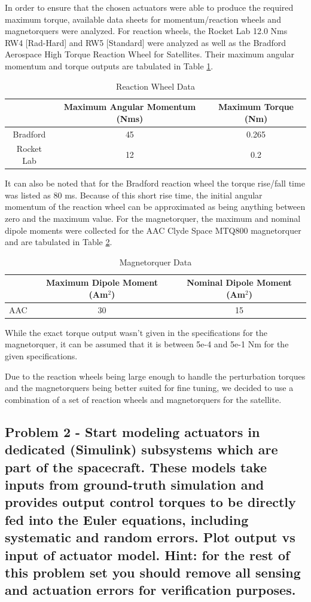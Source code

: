 In order to ensure that the chosen actuators were able to produce the required maximum torque, available data sheets for momentum/reaction wheels and magnetorquers were analyzed. For reaction wheels, the Rocket Lab 12.0 Nms RW4 [Rad-Hard] and RW5 [Standard] were analyzed as well as the Bradford Aerospace High Torque Reaction Wheel for Satellites. Their maximum angular momentum and torque outputs are tabulated in Table \ref{table:rw}.

\begin{table}
\begin{tabular}{c|c|c}
    & Maximum Angular Momentum (Nms) & Maximum Torque (Nm) \\
    \hline 
    Bradford & 45 & 0.265 \\
    \hline 
    Rocket Lab & 12 & 0.2 \\
\end{tabular}
\caption{Reaction Wheel Data}
\label{table:rw}
\end{table}

It can also be noted that for the Bradford reaction wheel the torque rise/fall time was listed as 80 ms. Because of this short rise time, the initial angular momentum of the reaction wheel can be approximated as being anything between zero and the maximum value. For the magnetorquer, the maximum and nominal dipole moments were collected for the AAC Clyde Space MTQ800 magnetorquer and are tabulated in Table \ref{table:magnetorquer}.

\begin{table}
\begin{tabular}{c|c|c}
    & Maximum Dipole Moment (Am$^2$) & Nominal Dipole Moment (Am$^2$) \\
    \hline 
    AAC & 30 & 15 \\
\end{tabular}
\caption{Magnetorquer Data}
\label{table:magnetorquer}
\end{table}

While the exact torque output wasn't given in the specifications for the magnetorquer, it can be assumed that it is between 5e-4 and 5e-1 Nm for the given specifications. 

Due to the reaction wheels being large enough to handle the perturbation torques and the magnetorquers being better suited for fine tuning, we decided to use a combination of a set of reaction wheels and magnetorquers for the satellite.

\subsection{Problem 2 - Start modeling actuators in dedicated (Simulink) subsystems which are part of the spacecraft. These models take inputs from ground-truth simulation and provides output control torques to be directly fed into the Euler equations, including systematic and random errors. Plot output vs input of actuator model. Hint: for the rest of this problem set you should remove all sensing and actuation errors for verification purposes.}

